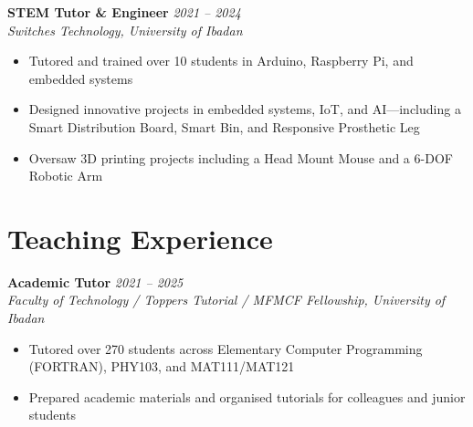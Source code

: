 \documentclass[10pt, a4paper]{article}
\newcommand{\cventry}[4]{%
  \noindent\textbf{#1} \hfill \textit{#2}\\%
  \textit{#3} \hfill \small{#4}\\[-4pt]%
}
\begin{document}
\vspace{4pt}
\cventry{STEM Tutor \& Engineer}{2021 -- 2024}{Switches Technology, University of Ibadan}{}
\begin{itemize}
  \item Tutored and trained over 10 students in Arduino, Raspberry Pi, and embedded systems
  \item Designed innovative projects in embedded systems, IoT, and AI---including a Smart Distribution Board, Smart Bin, and Responsive Prosthetic Leg
  \item Oversaw 3D printing projects including a Head Mount Mouse and a 6-DOF Robotic Arm
\end{itemize}
\section{Teaching Experience}

\cventry{Academic Tutor}{2021 -- 2025}{Faculty of Technology / Toppers Tutorial / MFMCF Fellowship, University of Ibadan}{}
\begin{itemize}
  \item Tutored over 270 students across Elementary Computer Programming (FORTRAN), PHY103, and MAT111/MAT121
  \item Prepared academic materials and organised tutorials for colleagues and junior students
\end{itemize}

\end{document}
